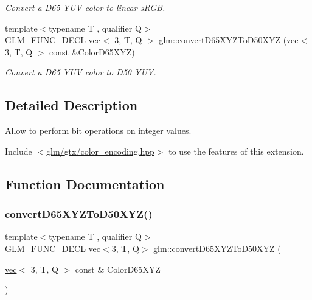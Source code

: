 \begin{DoxyCompactItemize}
\begin{DoxyCompactList}\small\item\em Convert a D65 Y\+UV color to linear s\+R\+GB. \end{DoxyCompactList}\item 
{\footnotesize template$<$typename T , qualifier Q$>$ }\\\mbox{\hyperlink{setup_8hpp_ab2d052de21a70539923e9bcbf6e83a51}{G\+L\+M\+\_\+\+F\+U\+N\+C\+\_\+\+D\+E\+CL}} \mbox{\hyperlink{structglm_1_1vec}{vec}}$<$ 3, T, Q $>$ \mbox{\hyperlink{group__gtx__color__encoding_gad12f4f65022b2c80e33fcba2ced0dc48}{glm\+::convert\+D65\+X\+Y\+Z\+To\+D50\+X\+YZ}} (\mbox{\hyperlink{structglm_1_1vec}{vec}}$<$ 3, T, Q $>$ const \&Color\+D65\+X\+YZ)
\begin{DoxyCompactList}\small\item\em Convert a D65 Y\+UV color to D50 Y\+UV. \end{DoxyCompactList}\end{DoxyCompactItemize}


\subsection{Detailed Description}
Allow to perform bit operations on integer values. 

Include $<$\mbox{\hyperlink{color__encoding_8hpp}{glm/gtx/color\+\_\+encoding.\+hpp}}$>$ to use the features of this extension. 

\subsection{Function Documentation}
\mbox{\label{group__gtx__color__encoding_gad12f4f65022b2c80e33fcba2ced0dc48}} 
\subsubsection{\texorpdfstring{convert\+D65\+X\+Y\+Z\+To\+D50\+X\+Y\+Z()}{convertD65XYZToD50XYZ()}}
{\footnotesize\ttfamily template$<$typename T , qualifier Q$>$ \\
\mbox{\hyperlink{setup_8hpp_ab2d052de21a70539923e9bcbf6e83a51}{G\+L\+M\+\_\+\+F\+U\+N\+C\+\_\+\+D\+E\+CL}} \mbox{\hyperlink{structglm_1_1vec}{vec}}$<$3, T, Q$>$ glm\+::convert\+D65\+X\+Y\+Z\+To\+D50\+X\+YZ (\begin{DoxyParamCaption}\item[{\mbox{\hyperlink{structglm_1_1vec}{vec}}$<$ 3, T, Q $>$ const \&}]{Color\+D65\+X\+YZ }\end{DoxyParamCaption})}



